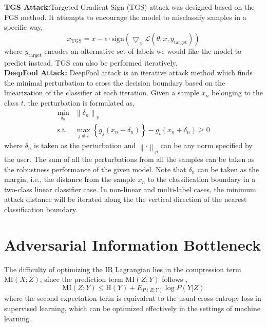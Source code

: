 \documentclass[10pt,journal,compsoc]{IEEEtran}
\begin{document}
\noindent \textbf{TGS Attack:}\quad  Targeted Gradient Sign (TGS) attack was designed based on the FGS method. It attempts to encourage the model to misclassify samples in a specific way,
\begin{equation*}
x_{\text{TGS}} = x - \epsilon \cdot{} \text{sign}(\bigtriangledown_x{}\mathcal{L}(\theta,x,y_{\text{target}}))
\end{equation*}
where $y_{\text{target}}$ encodes an alternative set of labels we would like the model to predict instead. TGS can also be performed iteratively.
\\

\noindent \textbf{DeepFool Attack:} \quad DeepFool attack \cite{MoosaviDezfooli2016DeepFoolAS} is an iterative attack method which finds the minimal perturbation to cross the decision boundary based on the linearization of the classifier at each iteration. Given a sample $x_n$ belonging to the class $t$, the perturbation is formulated as,
\begin{equation*}
\begin{array}{ll}
\underset{\delta_n}{\operatorname{min}} & \left\|\delta_n\right\|_{p} \\
\text {s.t.} & \max _{j \neq t}\left\{g_{j}(x_n+\delta_n)\right\}-g_{t}(x_n+\delta_n) \geq 0
\end{array}
\end{equation*}
where $\delta_n$ is taken as the perturbation and $\left\| \cdot \right\|_{p}$ can be any norm specified by the user. The sum of all the perturbations from all the samples can be taken as the robustness performance of the given model. Note that $\delta_n$ can be taken as the margin, i.e., the distance from the sample $x_n$ to the classification boundary in a two-class linear classifier case. In non-linear and multi-label cases, the minimum attack distance will be iterated along the the vertical direction of the nearest classification boundary.


\section{Adversarial Information Bottleneck}\label{sec:AIB}
The difficulty of optimizing the IB Lagrangian lies in the compression term $\mathrm{MI}(X; Z)$, since the prediction term $\mathrm{MI}(Z; Y)$ follows \cite{Alemi2017DeepVI,Kolchinsky2019NonlinearIB},
\begin{equation}
\mathrm{MI}(Z; Y) \leq \mathrm{H}(Y) + E_{P(Z; Y)}\log P(Y|Z)
\end{equation}
where the second expectation term is equivalent to the usual cross-entropy loss in supervised learning, which can be optimized effectively in the settings of machine learning.
\end{document}
